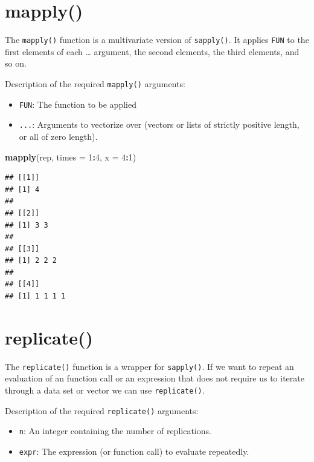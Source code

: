 \documentclass[
]{book}
\newenvironment{Shaded}{\begin{snugshade}}{\end{snugshade}}
\newcommand{\DataTypeTok}[1]{\textcolor[rgb]{0.13,0.29,0.53}{#1}}
\newcommand{\DecValTok}[1]{\textcolor[rgb]{0.00,0.00,0.81}{#1}}
\newcommand{\KeywordTok}[1]{\textcolor[rgb]{0.13,0.29,0.53}{\textbf{#1}}}
\newcommand{\NormalTok}[1]{#1}
\newcommand{\OperatorTok}[1]{\textcolor[rgb]{0.81,0.36,0.00}{\textbf{#1}}}
\providecommand{\tightlist}{%
  \setlength{\itemsep}{0pt}\setlength{\parskip}{0pt}}
\begin{document}
\hypertarget{mapply}{%
\section{mapply()}\label{mapply}}

The \texttt{mapply()} function is a multivariate version of \texttt{sapply()}. It applies \texttt{FUN} to the first elements of each \ldots{} argument, the second elements, the third elements, and so on.

Description of the required \texttt{mapply()} arguments:

\begin{itemize}
\tightlist
\item
  \texttt{FUN}: The function to be applied
\item
  \texttt{...}: Arguments to vectorize over (vectors or lists of strictly positive length, or all of zero length).
\end{itemize}

\begin{Shaded}
\begin{Highlighting}[]
\KeywordTok{mapply}\NormalTok{(rep, }\DataTypeTok{times =} \DecValTok{1}\OperatorTok{:}\DecValTok{4}\NormalTok{, }\DataTypeTok{x =} \DecValTok{4}\OperatorTok{:}\DecValTok{1}\NormalTok{)}
\end{Highlighting}
\end{Shaded}

\begin{verbatim}
## [[1]]
## [1] 4
## 
## [[2]]
## [1] 3 3
## 
## [[3]]
## [1] 2 2 2
## 
## [[4]]
## [1] 1 1 1 1
\end{verbatim}

\hypertarget{replicate}{%
\section{replicate()}\label{replicate}}

The \texttt{replicate()} function is a wrapper for \texttt{sapply()}. If we want to repeat an evaluation of an function call or an expression that does not require us to iterate through a data set or vector we can use \texttt{replicate()}.

Description of the required \texttt{replicate()} arguments:

\begin{itemize}
\tightlist
\item
  \texttt{n}: An integer containing the number of replications.
\item
  \texttt{expr}: The expression (or function call) to evaluate repeatedly.
\end{itemize}
\end{document}
